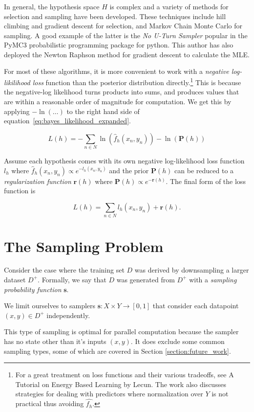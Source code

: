 \documentclass[twoside]{article}
\begin{document}
In general, the hypothesis space \(H\) is complex and a variety of methods for selection and sampling have been developed. These techniques include hill climbing and gradient descent for selection, and Markov Chain Monte Carlo for sampling. A good example of the latter is the \textit{No U-Turn Sampler}\cite{gelman} popular in the PyMC3\cite{pymc3} probabilistic programming package for python. This author has also deployed the Newton Raphson method for gradient descent to calculate the MLE.\cite{sklar_dirichlet}

For most of these algorithms, it is more convenient to work with a \textit{negative log-likilihood loss} function than the posterior distribution directly.\footnote{For a great treatment on loss functions and their various tradeoffs, see A Tutorial on Energy Based Learning by Lecun\cite{lecun}. The work also discusses strategies for dealing with predictors where normalization over \(Y\) is not practical thus avoiding \(\hat{f_h}\).} This is because the negative-log likelihood turns products into sums, and produces values that are within a reasonable order of magnitude for computation. We get this by applying \(-\ln(\ldots)\) to the right hand side of equation~\ref{eq:bayes_likelihood_expanded}.

\[L(h)=-\sum_{n \in N} \ln(\hat{f}_h(x_n,y_n))-\ln(\mathbf{P}(h))\]

Assume each hypothesis comes with its own negative log-likelihood loss function \(l_h\) where \(\hat{f}_h(x_n,y_n)\propto e^{-l_h(x_n,y_n)}\) and the prior \(\mathbf{P}(h)\) can be reduced to a \textit{regularization function} \(\mathbf{r}(h)\) where \(\mathbf{P}(h)\propto e^{-\mathbf{r}(h)}\). The final form of the loss function is

\[L(h)=\sum_{n \in N} l_h(x_n,y_n)+\mathbf{r}(h).\]

\section{The Sampling Problem}
\label{section:problem}

Consider the case where the training set \(D\) was derived by downsampling a larger dataset \(D^+\). Formally, we say that \(D\) was generated from \(D^+\) with a \textit{sampling probability function} \(\mathbf{s}\).

We limit ourselves to samplers \(\mathbf{s}: X \times Y \rightarrow \left [ 0, 1\right ]\) that consider each datapoint \((x, y) \in D^+\) independently.

This type of sampling is optimal for parallel computation because the sampler has no state other than it's inputs \((x, y)\). It does exclude some common sampling types, some of which are covered in Section \ref{section:future_work}.
\end{document}
